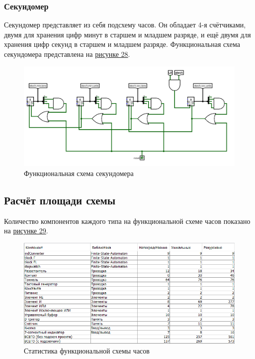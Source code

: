 \documentclass[11pt,a4paper,final]{article} %
\begin{document}
\subsubsection{Секундомер}
Секундомер представляет из себя подсхему часов. Он обладает 4-я счётчиками, двумя для хранения цифр минут в старшем и младшем разряде, и ещё двумя для хранения цифр секунд в старшем и младшем разряде. Функциональная схема секундомера представлена на \hyperref[fig:stopwatch]{рисунке 28}.

\begin{figure}[H]
	\centering
	\includegraphics[width=1.0 \linewidth]{img/stopwatch.png}
	\caption{Функциональная схема секундомера}
	\label{fig:stopwatch}
\end{figure}

\subsection{Расчёт площади схемы}

Количество компонентов каждого типа на функциональной схеме часов показано на \hyperref[fig:stats]{рисунке 29}.

\newpage
\begin{figure}[H]
	\centering
	\includegraphics[width=1.0 \linewidth]{img/stats.png}
	\caption{Статистика функциональной схемы часов}
	\label{fig:stats}
\end{figure}
\end{document}
